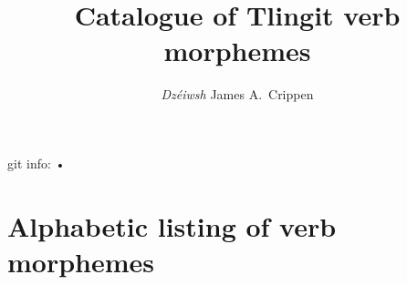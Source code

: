 \documentclass[12pt,letterpaper,oneside,article]{memoir}
\begin{document}
\title{Catalogue of Tlingit verb morphemes}
\author{\textit{Dzéiwsh} James A.\ Crippen}

\maketitle
\begin{center}
\color{gray}\tiny\sffamily
	git info:
	\gitBranch{}
	\gitAbbrevHash{}
	•
	\gitCommitterIsoDate
\end{center}
\tableofcontents*

\clearpage


\clearpage
\section{Alphabetic listing of verb morphemes}\label{sec:alphalist}

























\clearpage


\clearpage
\raggedyright
\printbibliography\label{sec:bibliography} 
\end{document}
